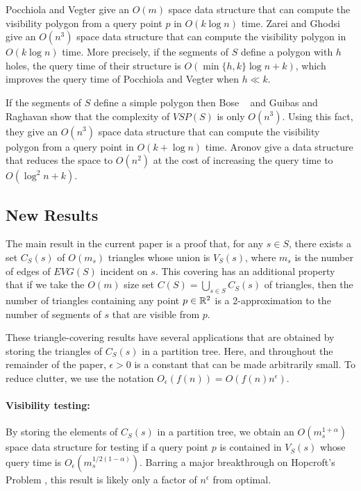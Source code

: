 \documentclass{patmorin}
\newcommand{\EVG}{\mathit{EVG}}
\newcommand{\VSP}{\mathit{VSP}}
\newcommand{\Oe}{O_\epsilon}
\begin{document}
Pocchiola and Vegter \cite{pvXX} give an $O(m)$ space data structure that
can compute the visibility polygon from a query point $p$ in $O(k \log n)$
time.  Zarei and Ghodsi give an $O(n^3)$ space data structure that can
compute the visibility polygon in $O(k \log n)$ time.  More precisely, if
the segments of $S$ define a polygon with $h$ holes, the query time of
their structure is $O(\min\{h,k\}\log n + k)$, which improves the query
time of Pocchiola and Vegter when $h \ll k$.

If the segments of $S$ define a simple polygon then Bose \etal\ \cite{X}
and Guibas and Raghavan \cite{X} show that the complexity of $\VSP(S)$ is
only $O(n^3)$.  Using this fact, they give an $O(n^3)$ space data structure
that can compute the visibility polygon from a query point in $O(k + \log
n)$ time.  Aronov \etal \cite{axxX} give a data structure that reduces the
space to $O(n^2)$ at the cost of increasing the query time to $O(\log^2 n +
k)$.

\subsection{New Results}

The main result in the current paper is a proof that, for any $s\in S$,
there exists a set $C_S(s)$ of $O(m_s)$ triangles whose union is $V_S(s)$,
where $m_s$ is the number of edges of $\EVG(S)$ incident on $s$.  This
covering has an additional property that if we take the $O(m)$ size set
$C(S)=\bigcup_{s\in S}C_S(s)$ of triangles, then the number of triangles
containing any point $p\in\mathbb{R}^2$ is a 2-approximation to the number of
segments of $s$ that are visible from $p$.

These triangle-covering results have several applications that are obtained
by storing the triangles of $C_S(s)$ in a partition tree.   Here, and
throughout the remainder of the paper, $\epsilon > 0$ is a constant that
can be made arbitrarily small. To reduce clutter, we use the notation
$\Oe(f(n))=O(f(n)n^{\epsilon})$.

\paragraph{Visibility testing:} 
By storing the elements of $C_S(s)$ in a partition tree, we obtain an
$O(m_s^{1+\alpha})$ space data structure for testing if a query point $p$
is contained in $V_S(s)$ whose query time is $\Oe(m_s^{1/2(1-\alpha)})$.
Barring a major breakthrough on Hopcroft's Problem \cite{hXX,eXX},
this result is likely only a factor of $n^\epsilon$ from optimal.
\end{document}
